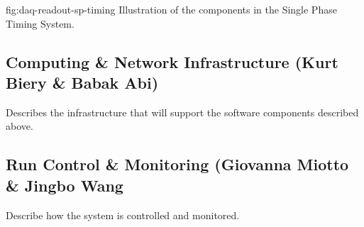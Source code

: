 \begin{dunefigure}{fig:daq-readout-sp-timing}
  {Illustration of the components in the Single Phase Timing System.}
\end{dunefigure}

\subsection{Computing \& Network Infrastructure (Kurt Biery \& Babak Abi)}
\label{sec:fdsp-daq-infra}

Describes the infrastructure that will support the software components described above.

\subsection{Run Control \& Monitoring (Giovanna Miotto \& Jingbo Wang}
\label{sec:fdsp-daq-tcm}

Describe how the system is controlled and monitored.

